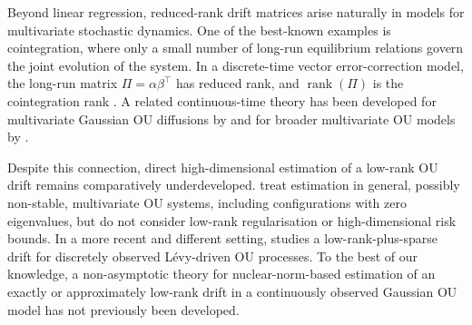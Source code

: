 \documentclass[11pt]{article}
\begin{document}
Beyond linear regression, reduced-rank drift matrices arise naturally in models for multivariate stochastic dynamics. One of the best-known examples is cointegration, where only a small number of long-run equilibrium relations govern the joint evolution of the system.  In a discrete-time vector error-correction model, the long-run matrix $\Pi=\alpha\beta^{\top}$ has reduced rank, and $\operatorname{rank}(\Pi)$ is the cointegration rank \citep{EngleGranger1987,Johansen1995}.  A related continuous-time theory has been developed for multivariate Gaussian OU diffusions by \citet{KesslerRahbek2004} and for broader multivariate OU models by \citet{Fasen2013}.  

Despite this connection, direct high-dimensional estimation of a low-rank OU drift remains comparatively underdeveloped.  \citet{BasakLee2008} treat estimation in general, possibly non-stable, multivariate OU systems, including configurations with zero eigenvalues, but do not consider low-rank regularisation or high-dimensional risk bounds.  In a more recent and different setting, \citet{Palaisti2026} studies a low-rank-plus-sparse drift for discretely observed L\'{e}vy-driven OU processes.  To the best of our knowledge, a non-asymptotic theory for nuclear-norm-based estimation of an exactly or approximately low-rank drift in a continuously observed Gaussian OU model has not previously been developed.
\end{document}
